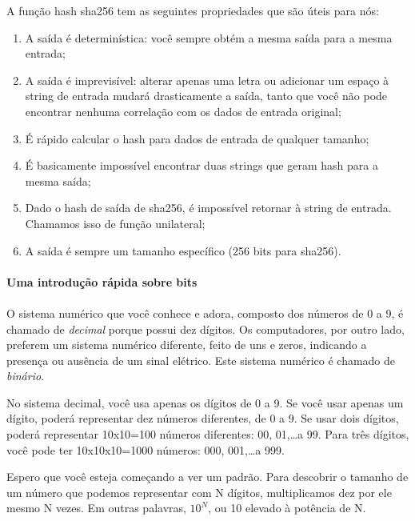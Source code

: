 A função hash sha256 tem as seguintes propriedades que são úteis para nós:

\begin{enumerate}
\item A saída é determinística: você sempre obtém a mesma saída para a mesma entrada;
\item A saída é imprevisível: alterar apenas uma letra ou adicionar um espaço à string de entrada mudará drasticamente a saída, tanto que você não pode encontrar nenhuma correlação com os dados de entrada original;
\item É rápido calcular o hash para dados de entrada de qualquer tamanho;
\item É basicamente impossível encontrar duas strings que geram hash para a mesma saída;
\item Dado o hash de saída de sha256, é impossível retornar à string de entrada. Chamamos isso de função unilateral;
\item A saída é sempre um tamanho específico (256 bits para sha256).
\end{enumerate}

\newpage

\paragraph{Uma introdução rápida sobre bits}
\paragraph{}

O sistema numérico que você conhece e adora, composto dos números de 0 a 9, é chamado de \textit{decimal} porque possui dez dígitos. Os computadores, por outro lado, preferem um sistema numérico diferente, feito de uns e zeros, indicando a presença ou ausência de um sinal elétrico. Este sistema numérico é chamado de \textit{binário}.

No sistema decimal, você usa apenas os dígitos de 0 a 9. Se você usar apenas um dígito, poderá representar dez números diferentes, de 0 a 9. Se usar dois dígitos, poderá representar 10x10=100 números diferentes: 00, 01,\ldots a 99. Para três dígitos, você pode ter 10x10x10=1000 números: 000, 001,\ldots a 999.

Espero que você esteja começando a ver um padrão. Para descobrir o tamanho de um número que podemos representar com N dígitos, multiplicamos dez por ele mesmo N vezes. Em outras palavras, \(10^N\), ou 10 elevado à potência de N.

